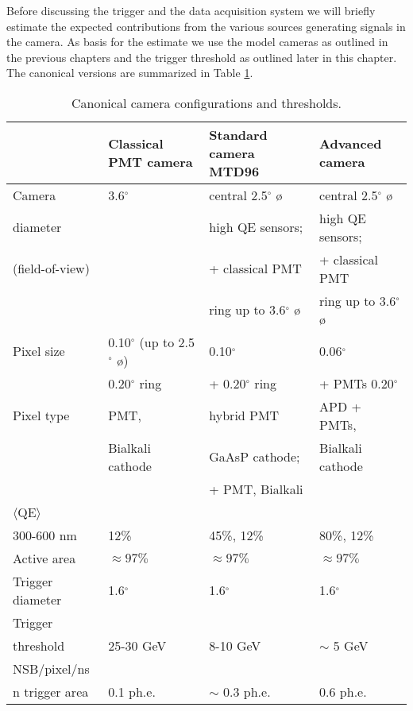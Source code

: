 
\medskip Before discussing the trigger and the data acquisition system we will
briefly estimate the expected contributions from the various sources
generating signals in the camera. As basis for the estimate we use the model
cameras as outlined in the previous chapters and the trigger threshold as
outlined later in this chapter. The canonical versions are summarized in
Table \ref{tab-camera_configurations}.

\newpage 

\begin{table}[htb]
\begin{center}
{\small
\begin{tabular}{|p{1.1in}|p{1.3in}|p{1.3in}|p{1.3in}|}
\hline
                & Classical PMT camera    & Standard camera MTD96       & Advanced camera \\ \hline
Camera          & 3.6$^{\circ }$          & central 2.5$^{\circ }$ {\o} & central 2.5$^{\circ }$ {\o}  \\ 
diameter        &                         & high QE sensors;             & high QE sensors; \\ 
(field-of-view) &          & + classical PMT  & + classical PMT  \\ 
                &          & ring up to 3.6$^{\circ }$ {\o} & ring up to 3.6$^{\circ }$ {\o}\\ \hline
Pixel size & 0.10$^{\circ }$ (up to 2.5$^{\circ}$ {\o})  & 0.10$^{\circ }$ 
 & 0.06$^{\circ }$  \\ 
           &  0.20$^{\circ }$ ring & + 0.20$^{\circ }$ ring & + PMTs 0.20$^{\circ }$ \\ \hline
Pixel type & PMT,              & hybrid PMT  & APD + PMTs,\\
           &  Bialkali cathode &  GaAsP cathode; &  Bialkali cathode\\ 
           &                    &  + PMT, Bialkali &  \\ \hline
$\langle $QE$\rangle$  &  &  & \\ 
 300-600 nm  & 12\% & 45\%, 12\% & 80\%, 12\% \\ \hline
Active area & $\approx 97\%$ & $\approx 97\%$ & $\approx 97\%$ \\ \hline
Trigger diameter & 1.6$^{\circ }$ & 1.6$^{\circ }$ & 1.6$^{\circ }$ \\ \hline
Trigger  &  & &  \\ 
threshold & 25-30 GeV & 8-10 GeV & $\sim$ 5 GeV \\ \hline
NSB/pixel/ns  &  & &  \\ 
n trigger area & 0.1 ph.e. & $\sim$ 0.3 ph.e. & 0.6 ph.e. \\ \hline
\end{tabular}
}

\caption{\label{tab-camera_configurations} Canonical camera configurations and thresholds.}
\end{center}
\end{table}

